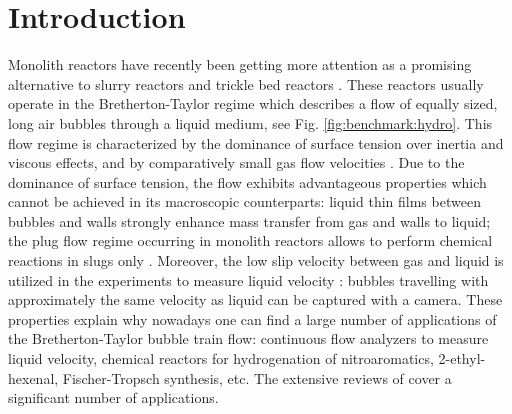 \documentclass{article}
\begin{document}
\section{Introduction}
\label{intro}
Monolith reactors have recently been getting more attention as a promising alternative to slurry
reactors and trickle bed reactors \cite{kreutzer-overview,bercic-mass}.  These reactors usually operate in
 the Bretherton-Taylor regime \cite{bretherton,taylor} which describes a flow
 of equally sized, long air bubbles through a liquid medium, see
Fig. \ref{fig:benchmark:hydro}. This flow regime
is characterized by the dominance of surface tension over inertia and viscous effects, and by
comparatively small gas flow velocities \cite{yue-mass}. Due to the dominance of surface tension, the flow exhibits advantageous
 properties which cannot be achieved
in its macroscopic counterparts: liquid thin films \cite{bretherton} between bubbles and walls strongly enhance mass
transfer from gas and walls to liquid; the plug flow regime occurring in monolith reactors allows to perform chemical reactions in slugs only \cite{kreutzer-overview}.
 Moreover, the low slip velocity between gas and liquid is utilized in the experiments to measure liquid velocity \cite{taylor}:  bubbles
 travelling with approximately the same velocity as liquid can be captured with a camera. These properties explain why nowadays one can find a large number of applications
of the Bretherton-Taylor bubble train flow: continuous flow analyzers to measure liquid velocity, chemical reactors for hydrogenation of nitroaromatics, 2-ethyl-hexenal, Fischer-Tropsch synthesis, etc. The extensive reviews of \citet{kreutzer-overview,
gupta-review,yue-mass} cover a significant number of applications.
\end{document}
